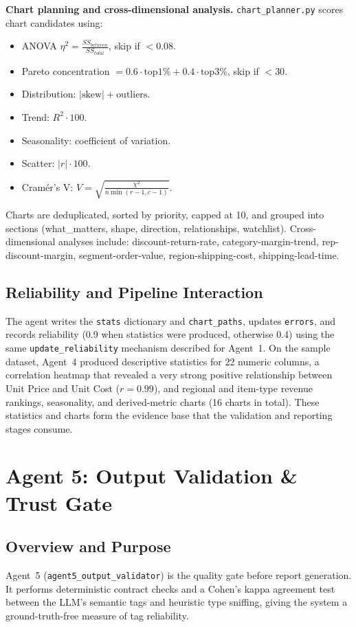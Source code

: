 \documentclass[12pt,a4paper,openany]{report}
\begin{document}
\textbf{Chart planning and cross-dimensional analysis.} \texttt{chart\_planner.py} scores chart candidates using:
\begin{itemize}
	\item ANOVA $\eta^2 = \frac{SS_{between}}{SS_{total}}$, skip if $<0.08$.
	\item Pareto concentration $=0.6 \cdot \text{top1\%} + 0.4 \cdot \text{top3\%}$, skip if $<30$.
	\item Distribution: $|\text{skew}| + \text{outliers}$.
	\item Trend: $R^2 \cdot 100$.
	\item Seasonality: coefficient of variation.
	\item Scatter: $|r| \cdot 100$.
	\item Cramér's V: $V = \sqrt{\frac{\chi^2}{n \min(r-1,c-1)}}$.
\end{itemize}
Charts are deduplicated, sorted by priority, capped at 10, and grouped into sections (what\_matters, shape, direction, relationships, watchlist). Cross-dimensional analyses include: discount-return-rate, category-margin-trend, rep-discount-margin, segment-order-value, region-shipping-cost, shipping-lead-time.

\subsection{Reliability and Pipeline Interaction}
The agent writes the \texttt{stats} dictionary and \texttt{chart\_paths}, updates \texttt{errors}, and records reliability (0.9 when statistics were produced, otherwise 0.4) using the same \texttt{update\_reliability} mechanism described for Agent~1. On the sample dataset, Agent~4 produced descriptive statistics for 22 numeric columns, a correlation heatmap that revealed a very strong positive relationship between Unit Price and Unit Cost ($r=0.99$), and regional and item-type revenue rankings, seasonality, and derived-metric charts (16 charts in total). These statistics and charts form the evidence base that the validation and reporting stages consume.

\section{Agent 5: Output Validation \& Trust Gate}

\subsection{Overview and Purpose}
Agent~5 (\texttt{agent5\_output\_validator}) is the quality gate before report generation. It performs deterministic contract checks and a Cohen's kappa agreement test between the LLM's semantic tags and heuristic type sniffing, giving the system a ground-truth-free measure of tag reliability.
\end{document}
